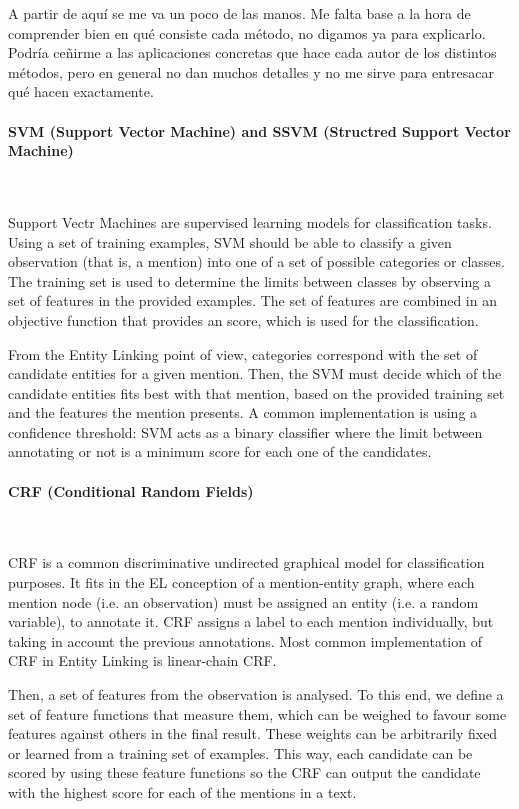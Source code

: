 {\color{red} A partir de aquí se me va un poco de las manos. Me falta base a la hora de comprender bien en qué consiste cada método, no digamos ya para explicarlo. Podría ceñirme a las aplicaciones concretas que hace cada autor de los distintos métodos, pero en general no dan muchos detalles y no me sirve para entresacar qué hacen exactamente.}


\paragraph{SVM (Support Vector Machine) and SSVM (Structred Support Vector Machine)}~

Support Vectr Machines are supervised learning models for classification tasks. Using a set of training examples, SVM should be able to classify a given observation (that is, a mention) into one of a set of possible categories or classes. The training set is used to determine the limits between classes by observing a set of features in the provided examples. The set of features are combined in an objective function that provides an score, which is used for the classification.

From the Entity Linking point of view, categories correspond with the set of candidate entities for a given mention. Then, the SVM must decide which of the candidate entities fits best with that mention, based on the provided training set and the features the mention presents. A common implementation is using a confidence threshold: SVM acts as a binary classifier where the limit between annotating or not is a minimum score for each one of the candidates.

\paragraph{CRF (Conditional Random Fields)}~


CRF is a common discriminative undirected graphical model for classification purposes. It fits in the EL conception of a mention-entity graph, where each mention node (i.e. an observation) must be assigned an entity (i.e. a random variable), to annotate it. CRF assigns a label to each mention individually, but taking in account the previous annotations. Most common implementation of CRF in Entity Linking is linear-chain CRF.

Then, a set of features from the observation is analysed. To this end, we define a set of feature functions that measure them, which can be weighed to favour some features against others in the final result. These weights can be arbitrarily fixed or learned from a training set of examples. This way, each candidate can be scored by using these feature functions so the CRF can output the candidate with the highest score for each of the mentions in a text.

